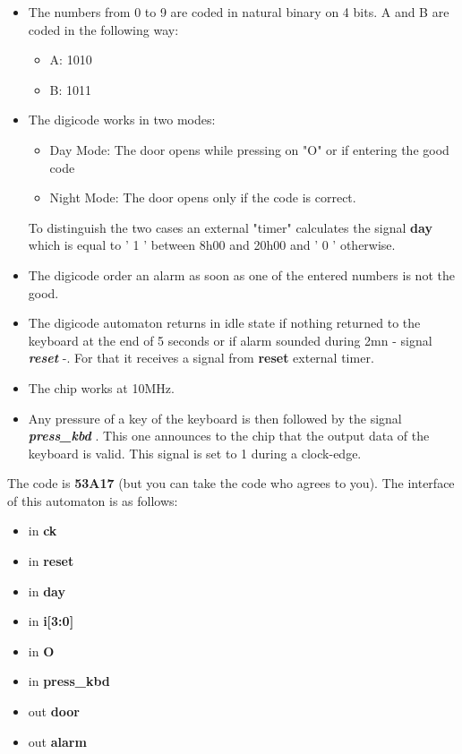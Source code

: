 \documentclass[12pt]{article}
\begin{document}
{\begin{itemize}\itemsep=-.8ex
\item   The numbers from 0 to 9 are coded in natural binary on 4 bits.
    A and B are coded in the following way:
    \begin{itemize}\itemsep=-.8ex
    \item   A: 1010
    \item   B: 1011
    \end{itemize}
\item   The digicode works in two modes:
    \begin{itemize}\itemsep=-.8ex
    \item   Day Mode: The door opens while pressing on "O" or if entering the good code
    \item   Night Mode: The door opens only if the code is correct.
    \end{itemize}
    To distinguish the two cases an external "timer" calculates the signal { \bf day}
    which is equal to ' 1 ' between 8h00 and 20h00 and ' 0 ' otherwise.
\item   The digicode order an alarm as soon as one of the entered
numbers is not the good. \item   The digicode automaton returns in
idle state if nothing
    returned to the keyboard at the end of 5 seconds
        or if alarm sounded during 2mn - signal { \it \bf reset } -. For that it receives a signal
        from { \bf reset } external timer.
\item   The chip works at 10MHz.
\item   Any pressure of a key of the keyboard is then followed by the signal { \it \bf press\_kbd }.
        This one announces to the chip that the output data of the
        keyboard is valid.  This signal is set to 1 during a clock-edge.
\end{itemize}

The code is { \bf 53A17 } (but you can take the code who agrees to
you). The interface of this automaton is as follows:

\begin{itemize}\itemsep=-.8ex
\item   in {\bf ck}
\item   in {\bf reset}
\item   in {\bf day}
\item   in {\bf i[3:0]}
\item   in {\bf O}
\item   in {\bf press\_kbd}
\item   out {\bf door}
\item   out {\bf alarm}
\end{itemize}


}
\end{document}
